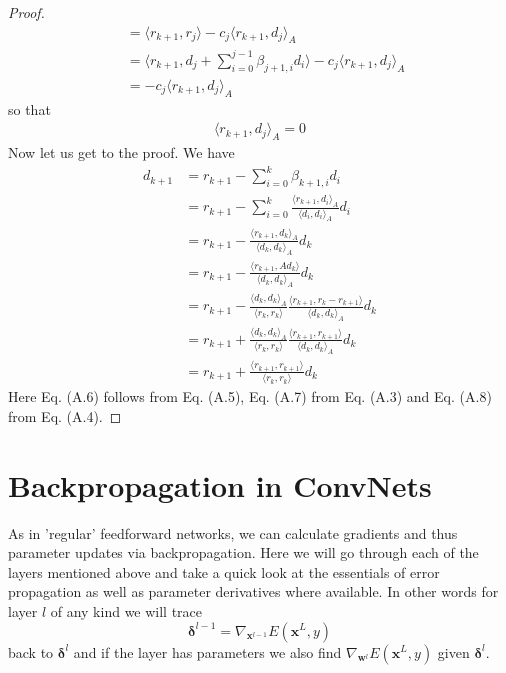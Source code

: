 \documentclass[preprint,12pt,3p]{elsarticle}
\begin{document}
\begin{proof}
\begin{align*}
    &=\langle r_{k+1},r_j\rangle-c_j\langle r_{k+1},d_j\rangle_A\\
    &=\langle r_{k+1},d_j+\sum_{i=0}^{j-1}\beta_{j+1,i}d_i\rangle-c_j\langle r_{k+1},d_j\rangle_A\\
    &=-c_j\langle r_{k+1},d_j\rangle_A
\end{align*}
so that
\begin{align}
    \langle r_{k+1},d_j\rangle_A=0
\end{align}
Now let us get to the proof. We have
\begin{align}
    d_{k+1}&=r_{k+1}-\sum_{i=0}^k\beta_{k+1,i}d_i\nonumber\\
    &=r_{k+1}-\sum_{i=0}^k\frac{\langle r_{k+1},d_i\rangle_{A}}{\langle d_i,d_i\rangle_{A}}d_i\nonumber\\
    &=r_{k+1}-\frac{\langle r_{k+1},d_k\rangle_{A}}{\langle d_k,d_k\rangle_{A}}d_k\\
    &=r_{k+1}-\frac{\langle r_{k+1},Ad_k\rangle}{\langle d_k,d_k\rangle_{A}}d_k\nonumber\\
    &=r_{k+1}-\frac{\langle d_k,d_k\rangle_A}{\langle r_k,r_k\rangle}\frac{\langle r_{k+1},r_k-r_{k+1}\rangle}{\langle d_k,d_k\rangle_{A}}d_k\\
    &=r_{k+1}+\frac{\langle d_k,d_k\rangle_A}{\langle r_k,r_k\rangle}\frac{\langle r_{k+1},r_{k+1}\rangle}{\langle d_k,d_k\rangle_{A}}d_k\\
    &=r_{k+1}+\frac{\langle r_{k+1},r_{k+1}\rangle}{\langle r_k,r_k\rangle}d_k\nonumber
\end{align}
Here Eq. (A.6) follows from Eq. (A.5), Eq. (A.7) from Eq. (A.3) and Eq. (A.8) from Eq. (A.4).
\end{proof}

\section{Backpropagation in ConvNets}

As in 'regular' feedforward networks, we can calculate gradients and thus parameter updates via backpropagation. Here we will go through each of the layers mentioned above and take a quick look at the essentials of error propagation as well as parameter derivatives where available. In other words for layer $l$ of any kind we will trace $$\boldsymbol{\delta}^{l-1}=\nabla_{\mathbf{x}^{l-1}}E(\mathbf{x}^L,y)$$
back to $\boldsymbol{\delta}^{l}$ and if the layer has parameters we also find 
$\nabla_{\mathbf{w}^l}E(\mathbf{x}^L,y)$
given $\boldsymbol{\delta}^{l}$.
\end{document}
